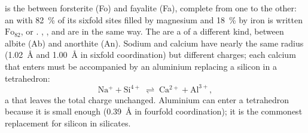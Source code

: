  is the  between forsterite  (Fo) and
fayalite  (Fa), complete from one  to the other: an
 with \qty{82}{\percent} of its sixfold sites filled by magnesium and
\qty{18}{\percent} by iron is written $\text{Fo}_{82}$, or
. , ,  and  are
 in the same way. The   are a  of a different kind, between albite  (Ab) and anorthite
 (An). Sodium and calcium have nearly the same radius
(\qty{1.02}{\angstrom} and \qty{1.00}{\angstrom} in sixfold coordination) but
different charges; each calcium that enters must be accompanied by an
aluminium replacing a silicon in a tetrahedron:
\[
  \mathrm{Na^{+}} + \mathrm{Si^{4+}} \;\rightleftharpoons\; \mathrm{Ca^{2+}} + \mathrm{Al^{3+}},
\]
a  that leaves the total charge unchanged.
Aluminium can enter a tetrahedron because it is small enough
(\qty{0.39}{\angstrom} in fourfold coordination); it is the commonest
replacement for silicon in silicates.

